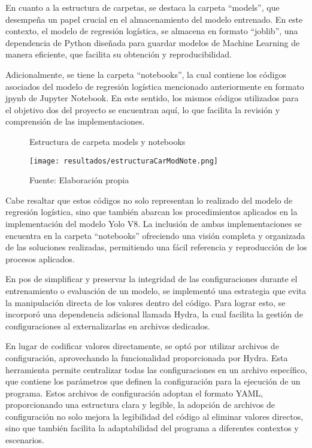 En cuanto a la estructura de carpetas, se destaca la carpeta ``models'', que desempeña un papel crucial en el almacenamiento del modelo entrenado. En este contexto, el modelo de regresión logística, se almacena en formato “joblib”, una dependencia de Python diseñada para guardar modelos de Machine Learning de manera eficiente, que facilita su obtención y reproducibilidad. \newline

Adicionalmente, se tiene la carpeta ``notebooks'', la cual contiene los códigos asociados del modelo de regresión logística mencionado anteriormente en formato jpynb de Jupyter Notebook. En este sentido, los mismos códigos utilizados para el objetivo dos del proyecto se encuentran aquí, lo que facilita la revisión y comprensión de las implementaciones.


\begin{figure}[h]
\centering
\caption{Estructura de carpeta models y notebooks}
\texttt{[image: resultados/estructuraCarModNote.png]}
\caption*{\footnotesize Fuente: Elaboración propia}
\label{fig:figuraEstructuraCarModNote}
\end{figure}

\newpage

Cabe resaltar que estos códigos no solo representan lo realizado del modelo de regresión logística, sino que también abarcan los procedimientos aplicados en la implementación del modelo Yolo V8. La inclusión de ambas implementaciones se encuentra en la carpeta ``notebooks'' ofreciendo una visión completa y organizada de las soluciones realizadas, permitiendo una fácil referencia y reproducción de los procesos aplicados. \newline

En pos de simplificar y preservar la integridad de las configuraciones durante el entrenamiento o evaluación de un modelo, se implementó una estrategia que evita la manipulación directa de los valores dentro del código. Para lograr esto, se incorporó una dependencia adicional llamada Hydra, la cual facilita la gestión de configuraciones al externalizarlas en archivos dedicados.

\newpage

En lugar de codificar valores directamente, se optó por utilizar archivos de configuración, aprovechando la funcionalidad proporcionada por Hydra. Esta herramienta permite centralizar todas las configuraciones en un archivo específico, que contiene los parámetros que definen la configuración para la ejecución de un programa. Estos archivos de configuración adoptan el formato YAML, proporcionando una estructura clara y legible, la adopción de archivos de configuración no solo mejora la legibilidad del código al eliminar valores directos, sino que también facilita la adaptabilidad del programa a diferentes contextos y escenarios. \newline

